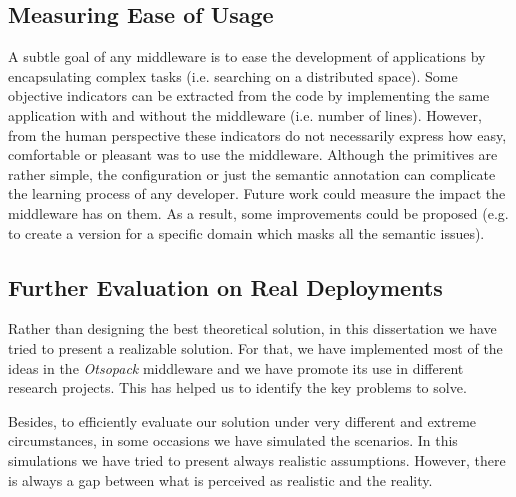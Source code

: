

\subsection{Measuring Ease of Usage}

A subtle goal of any middleware is to ease the development of applications by encapsulating complex tasks (i.e. searching on a distributed space).
Some objective indicators can be extracted from the code by implementing the same application with and without the middleware (i.e. number of lines).
However, from the human perspective these indicators do not necessarily express how easy, comfortable or pleasant was to use the middleware.
Although the primitives are rather simple, the configuration or just the semantic annotation can complicate the learning process of any developer.
Future work could measure the impact the middleware has on them.
As a result, some improvements could be proposed (e.g. to create a version for a specific domain which masks all the semantic issues).


\subsection{Further Evaluation on Real Deployments}

Rather than designing the best theoretical solution, in this dissertation we have tried to present a realizable solution.
For that, we have implemented most of the ideas in the \emph{Otsopack} middleware and we have promote its use in different research projects.
This has helped us to identify the key problems to solve.

Besides, to efficiently evaluate our solution under very different and extreme circumstances, in some occasions we have simulated the scenarios. %
In this simulations we have tried to present always realistic assumptions.
However, there is always a gap between what is perceived as realistic and the reality.

